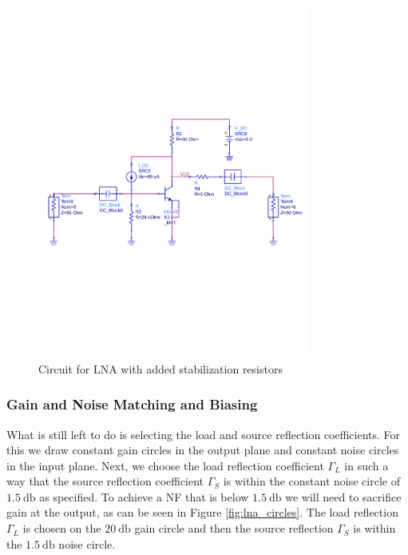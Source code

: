 \documentclass[a4paper]{article}        %
\begin{document}
			 \begin{figure}[H]
				\centering
				\includegraphics[width=0.8\textwidth]{fig/LNA/LNA_stable.pdf}
				\caption{Circuit for LNA with added stabilization resistors}
				\label{fig:lna_stable}
			\end{figure}

		\subsubsection{Gain and Noise Matching and Biasing}
		\label{sec:lna_matching}

			What is still left to do is selecting the load and source reflection coefficients. For this we draw constant gain circles in the output plane and constant noise circles in the input plane. Next, we choose the load reflection coefficient $\Gamma_L$ in such a way that the source reflection coefficient $\Gamma_S$ is within the constant noise circle of $\SI{1.5}{\decibel}$ as specified. To achieve a NF that is below $\SI{1.5}{\decibel}$ we will need to sacrifice gain at the output, as can be seen in Figure \ref{fig:lna_circles}. The load reflection $\Gamma_L$ is chosen on the $\SI{20}{\decibel}$ gain circle and then the source reflection $\Gamma_S$ is within the $\SI{1.5}{\decibel}$ noise circle. \\
\end{document}
